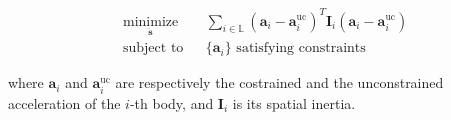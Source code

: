 \begin{equation}
    \begin{aligned}
         & \underset{\ddot{\mathbf{s}}}{\text{minimize}}
         &                                               & \sum _{i \in \mathbb{L}} (\mathbf{a}_i - \mathbf{a} _i ^{\text{uc} }) ^T \mathbf{I}_i(\mathbf{a}_i - \mathbf{a} ^{\text{uc}} _i) \\
         & \text{subject to}
         &                                               & \{\mathbf{a}_i\} \text{ satisfying constraints}
    \end{aligned}
\end{equation}

where $\mathbf{a} _i$ and $\mathbf{a} _i ^{\text{uc}}$ are respectively the costrained and the unconstrained acceleration of the $i$-th body, and $\mathbf{I}_i$ is its spatial inertia.


